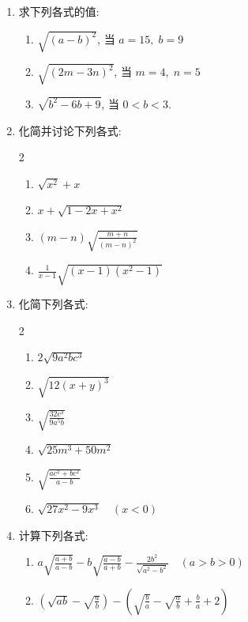 \begin{enumerate}
    \item 求下列各式的值:
\begin{enumerate}
    \item $\sqrt{(a-b)^{2}}$, 当 $a=15,\; b=9$
    \item $\sqrt{(2 m-3 n)^{2}}$, 当 $m=4,\; n=5$
    \item $\sqrt{b^{2}-6 b+9}$, 当 $0<b<3$.
\end{enumerate}
\item 化简并讨论下列各式:
\begin{multicols}{2}
   \begin{enumerate}
    \item $\sqrt{x^{2}}+x$
    \item $x+\sqrt{1-2 x+x^{2}}$
    \item $(m-n) \sqrt{\frac{m+n}{(m-n)^{2}}}$
    \item $\frac{1}{x-1} \sqrt{(x-1)\left(x^{2}-1\right)}$
\end{enumerate} 
\end{multicols}


\item 化简下列各式:
\begin{multicols}{2}
    \begin{enumerate}
\item $2 \sqrt{9 a^{2} b c^{3}}$
\item $\sqrt{12(x+y)^{3}}$
\item $\sqrt{\frac{32 c^{3}}{9 a^{5} b} }$
\item $\sqrt{25 m^{3}+50 m^{2}}$
\item  $\sqrt{\frac{a c^{2}+b c^{2}}{a-b}}$
\item  $\sqrt{27 x^{2}-9 x^{3}} \quad(x<0)$
\end{enumerate}
\end{multicols}


\item 计算下列各式:
\begin{enumerate}
\item $a \sqrt{\frac{a+b}{a-b}}-b \sqrt{\frac{a-b}{a+b}}-\frac{2 b^{2}}{\sqrt{a^{2}-b^{2}}}\quad (a>b>0)$
\item $\left(\sqrt{a b}-\sqrt{\frac{a}{b}}\right)-\left(\sqrt{\frac{b}{a}}-\sqrt{\frac{a}{b}}+\frac{b}{a}+2\right)$
\end{enumerate}


\end{enumerate}
